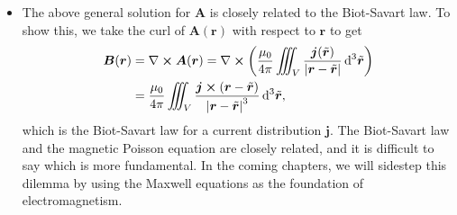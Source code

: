 \documentclass[11pt, a4paper]{article}
\newcommand{\diff}{\mathop{}\!\mathrm{d}} %
\newcommand{\dtr}{\diff^{3} \tilde{\r}}  %
\renewcommand{\vec}[1]{\bm{#1}} %
\renewcommand{\t}[1]{\tilde{#1}} %
\renewcommand{\r}{\vec{r}}
\newcommand{\B}{\vec{B}} %
\newcommand{\A}{\vec{A}} %
\newcommand{\mm}{\mu_{0}}  %
\renewcommand{\j}{\vec{j}}  %
\renewcommand{\curl}{\nabla \cross}
\begin{document}
\begin{itemize}
	\item The above general solution for $ \A $ is closely related to the Biot-Savart law. To show this, we take the curl of $ \A(\r) $ with respect to $ \r $ to get
	\begin{align*}
		\B(\r) &= \curl \A(\r) = \curl \left(\frac{\mm}{4\pi} \iiint_{V} \frac{\j(\t{\r})}{\abs{\r - \t{\r}}} \dtr\right)\\
		& = \frac{\mm}{4\pi} \iiint_{V} \frac{\j \cross (\r - \t{\r})}{\abs{\r - \t{\r}}^{3}} \dtr,
	\end{align*}
    which is the Biot-Savart law for a current distribution $ \j $. The Biot-Savart law and the magnetic Poisson equation are closely related, and it is difficult to say which is more fundamental. In the coming chapters, we will sidestep this dilemma by using the Maxwell equations as the foundation of electromagnetism.

\end{itemize}
\end{document}
